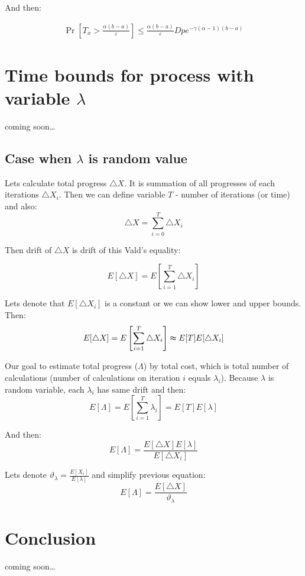 \documentclass[12pt, a4paper]{article}
\theoremstyle{remark}
\newcommand{\cm}{coming soon\dots}
\begin{document}
And then:

\begin{align*}
    \Pr\left[T_x > \frac{\alpha (b - a)}{\varepsilon}\right] \leq \frac{\alpha (b - a)}{\varepsilon} D p e^{-\gamma(\alpha - 1)(b - a)}
\end{align*}

\section{Time bounds for process with variable $\lambda$}
\cm
\subsection{Case when $\lambda$ is random value}
Lets calculate total progress $\triangle X$. It is summation of all progresses of each iterations $\triangle X_i$. Then we can define variable $T$ - number of iterations (or time) and also:
\[
    \triangle X = \sum_{i = 0}^{T} \triangle X_i
\]

Then drift of $\triangle X$ is drift of this Vald's equality: 

\[
    E[\triangle X] = E\left[\sum_{i = 1}^{T} \triangle X_i\right]      
\]

Lets denote that $E[\triangle X_i]$ is a constant or we can show lower and upper bounds. Then:
\[
    E[\triangle X] = E\left[\sum_{i = 1}^{T} \triangle X_i\right] \thickapprox E[T] E[\triangle X_i]      
\]

Our goal to estimate total progress ($\Lambda$) by total cost, which is total number of calculations (number of calculations on iteration $i$ equals $\lambda_i$). Because $\lambda$ is random variable, each $\lambda_i$ has same drift and then:
\[
    E\left[\Lambda\right] = E\left[\sum_{i = 1}^{T} \lambda_i\right] = E[T] E[\lambda]    
\]

And then: 
\[
        E[\Lambda] = \frac{E[\triangle X] E[\lambda]}{E[\triangle X_i]}
\]

Lets denote $\vartheta_\lambda = \frac{E[X_i]}{E[\lambda]}$ and simplify previous equation:
\[
        E[\Lambda] = \frac{E[\triangle X]}{\vartheta_\lambda}
\]

\section{Conclusion}
\cm
\end{document}
